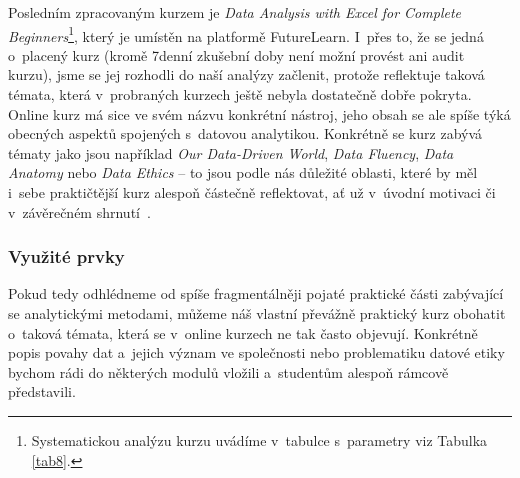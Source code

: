 Posledním zpracovaným kurzem je \emph{Data Analysis with Excel for Complete Beginners}\footnote{Systematickou analýzu kurzu uvádíme v~tabulce s~parametry viz Tabulka \ref{tab8}.}, který je umístěn na platformě FutureLearn. I~přes to, že se jedná o~placený kurz (kromě 7denní zkušební doby není možní provést ani audit kurzu), jsme se jej rozhodli do naší analýzy začlenit, protože reflektuje taková témata, která v~probraných kurzech ještě nebyla dostatečně dobře pokryta. Online kurz má sice ve svém názvu konkrétní nástroj, jeho obsah se ale spíše týká obecných aspektů spojených s~datovou analytikou. Konkrétně se kurz zabývá tématy jako jsou například \emph{Our Data-Driven World}, \emph{Data Fluency}, \emph{Data Anatomy} nebo \emph{Data Ethics} -- to jsou podle nás důležité oblasti, které by měl i~sebe praktičtější kurz alespoň částečně reflektovat, ať už v~úvodní motivaci či v~závěrečném shrnutí~\parencite{course8}.

\hypertarget{vyuux17eituxe9-prvky-7}{%
\subsubsection{Využité prvky}\label{vyuux17eituxe9-prvky-7}}

Pokud tedy odhlédneme od spíše fragmentálněji pojaté praktické části zabývající se analytickými metodami, můžeme náš vlastní převážně praktický kurz obohatit o~taková témata, která se v~online kurzech ne tak často objevují. Konkrétně popis povahy dat a~jejich význam ve společnosti nebo problematiku datové etiky bychom rádi do některých modulů vložili a~studentům alespoň rámcově představili.
